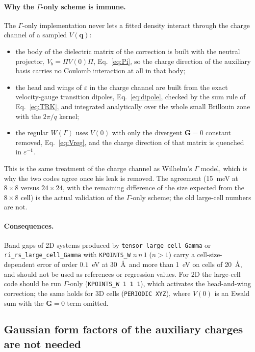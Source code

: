 \documentclass[%
 reprint,
superscriptaddress,
 amsmath,amssymb,
 aps,
prb,
]{revtex4-2}
\newcommand{\bq}{\mathbf{q}}
\newcommand{\bG}{\mathbf{G}}
\begin{document}
\paragraph{Why the $\Gamma$-only scheme is immune.}
The $\Gamma$-only implementation never lets a fitted density interact through the charge
channel of a sampled $V(\bq)$:
\begin{itemize}
\item the body of the dielectric matrix of the correction is built with the neutral projector,
      $V_b = \Pi V(0)\Pi$, Eq.~\eqref{eq:Pi}, so the charge direction of the auxiliary basis
      carries no Coulomb interaction at all in that body;
\item the head and wings of $\varepsilon$ in the charge channel are built from the exact
      velocity-gauge transition dipoles, Eq.~\eqref{eq:dipole}, checked by the sum rule of
      Eq.~\eqref{eq:TRK}, and integrated analytically over the whole small Brillouin zone with
      the $2\pi/q$ kernel;
\item the regular $W(\Gamma)$ uses $V(0)$ with only the divergent $\bG = 0$ constant removed,
      Eq.~\eqref{eq:Vreg}, and the charge direction of that matrix is quenched in
      $\varepsilon^{-1}$.
\end{itemize}
This is the same treatment of the charge channel as Wilhelm's $\Gamma$ model, which is why the
two codes agree once his leak is removed. The agreement (15~meV at $8\times8$ versus
$24\times24$, with the remaining difference of the size expected from the $8\times8$ cell) is
the actual validation of the $\Gamma$-only scheme; the old large-cell numbers are not.

\paragraph{Consequences.} Band gaps of 2D systems produced by
\texttt{tensor\_large\_cell\_Gamma} or \texttt{ri\_rs\_large\_cell\_Gamma} with
\texttt{KPOINTS\_W} $n\,n\,1$ ($n>1$) carry a cell-size-dependent error of order $0.1$~eV at
30~\AA\ and more than 1~eV on cells of 20~\AA, and should not be used as references or
regression values. For 2D the large-cell code should be run $\Gamma$-only
(\texttt{KPOINTS\_W 1 1 1}), which activates the head-and-wing correction; the same holds for
3D cells (\texttt{PERIODIC XYZ}), where $V(0)$ is an Ewald sum with the $\bG=0$ term omitted.

\subsection{Gaussian form factors of the auxiliary charges are not needed}
\label{sec:formfactor}
\end{document}
